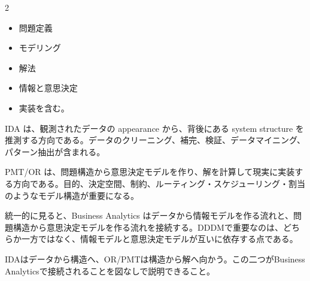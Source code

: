 \clearpage



\vspace{1.5mm}

\begin{multicols}{2}

\footnotesize

\raggedcolumns


\begin{itemize}
\item 問題定義
\item モデリング
\item 解法
\item 情報と意思決定
\item 実装を含む。
\end{itemize}

IDA は、観測されたデータの appearance から、背後にある system structure を推測する方向である。データのクリーニング、補完、検証、データマイニング、パターン抽出が含まれる。\par

PMT/OR は、問題構造から意思決定モデルを作り、解を計算して現実に実装する方向である。目的、決定空間、制約、ルーティング・スケジューリング・割当のようなモデル構造が重要になる。\par

統一的に見ると、Business Analytics はデータから情報モデルを作る流れと、問題構造から意思決定モデルを作る流れを接続する。DDDMで重要なのは、どちらか一方ではなく、情報モデルと意思決定モデルが互いに依存する点である。\par

IDAはデータから構造へ、OR/PMTは構造から解へ向かう。この二つがBusiness Analyticsで接続されることを図なしで説明できること。\par


\end{multicols}
